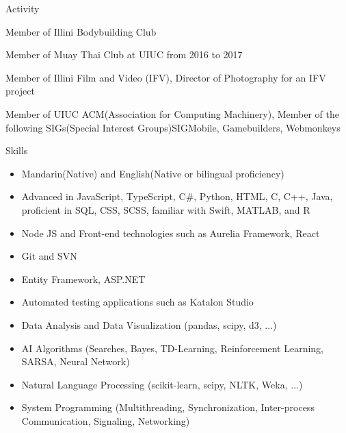 \documentclass{resume}
\begin{document}
\begin{rSection}{Activity} \itemsep -3pt

    \item Member of Illini Bodybuilding Club
    \item Member of Muay Thai Club at UIUC from 2016 to 2017
    \item Member of Illini Film and Video (IFV), Director of Photography for an IFV project
    \item Member of UIUC ACM(Association for Computing Machinery), Member of the following SIGs(Special Interest Groups)\colon SIGMobile, Gamebuilders, Webmonkeys

\end{rSection}

\begin{rSection}{Skills}

\begin{itemize}

    \item   Mandarin(Native) and English(Native or bilingual proficiency)
    \item	Advanced in JavaScript, TypeScript, C\#, Python, HTML, C, C++, Java, proficient in SQL, CSS, SCSS, familiar with Swift, MATLAB, and R
    \item	Node JS and Front-end technologies such as Aurelia Framework, React
    \item   Git and SVN
    \item	Entity Framework, ASP.NET
    \item	Automated testing applications such as Katalon Studio	
    \item   Data Analysis and Data Visualization (pandas, scipy, d3, ...)
    \item	AI Algorithms (Searches, Bayes, TD-Learning, Reinforcement Learning, SARSA, Neural Network)
    \item	Natural Language Processing (scikit-learn, scipy, NLTK, Weka, ...)
    \item	System Programming (Multithreading, Synchronization, Inter-process Communication, Signaling, Networking)

\end{itemize}

\end{rSection}
\end{document}
